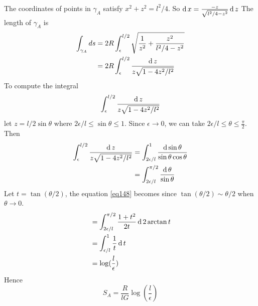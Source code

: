 \subsubsection{}
The coordinates of points in $\gamma_A$ satisfy $x^2 + z^2 = l^2/4$. So $\operatorname{d} x = \frac{-z}{\sqrt{l^2/4 - z^2}} \operatorname{d} z$
The length of $\gamma_A$ is 
\begin{equation}
	\begin{split}
	\int_{\gamma_A} ds & = 2 R\int_{\epsilon}^{l/2}  \sqrt{\frac{1}{z^2} + \frac{z^2}{l^2/4 -z^2}}\\
	& = 2R\int_{\epsilon}^{l/2} \frac{\operatorname{d} z}{z \sqrt{1- 4z^2/l^2}}
	\end{split}
\end{equation}
To compute the integral
\[
\int_{\epsilon}^{l/2} \frac{\operatorname{d} z}{z \sqrt{1-4z^2/l^2}}
\]
let $z=l/2 \sin \theta$ where $2\epsilon/l \leq  \sin \theta \leq 1$. Since $\epsilon \to 0$, we can take $ 2 \epsilon/l \leq \theta \leq \frac{\pi}{2}$. Then
\begin{equation}
\label{eq148}
	\begin{split}
	\int_{\epsilon}^{l/2} \frac{\operatorname{d} z}{z \sqrt{1-4 z^2/l^2}} & = \int_{2\epsilon/l}^{1} \frac{\operatorname{d} \sin \theta}{\sin \theta \cos \theta}\\
	& = \int_{2\epsilon/l}^{\pi/2} \frac{\operatorname{d} \theta}{\sin \theta}
	\end{split}
\end{equation}
Let $t = \tan (\theta/2)$, the equation \ref{eq148} becomes since $\tan(\theta/2) \sim  \theta/2$ when $\theta \to 0$.
\begin{equation}
	\begin{split}
	&=\int_{2\epsilon/l}^{\pi/2} \frac{1+t^2}{2t} \operatorname{d} 2\arctan t\\
	&= \int_{\epsilon/l}^{1}\frac{1}{t} \operatorname{d} t\\
	& = \log (\frac{l}{\epsilon})
	\end{split}
\end{equation}
Hence 
\begin{equation}
	S_A = \frac{R}{lG} \log \left( \frac{l}{\epsilon} \right)
\end{equation}
